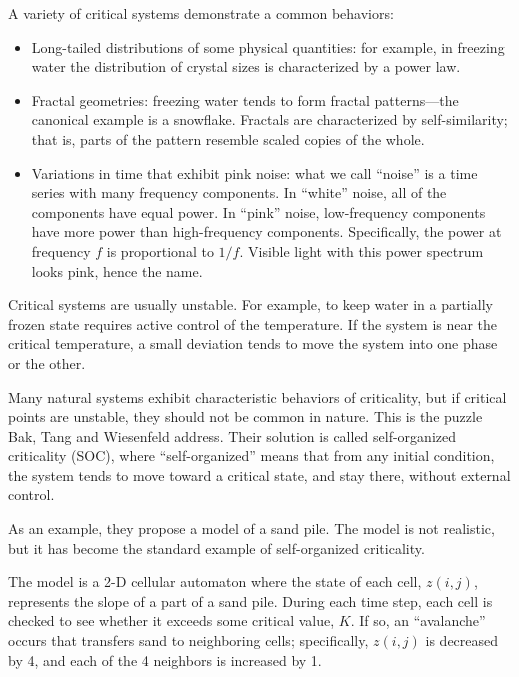\documentclass[10pt]{book}
\begin{document}
A variety of critical systems demonstrate a common behaviors:

\begin{itemize}

\item Long-tailed distributions of some physical quantities: for
  example, in freezing water the distribution of crystal sizes is
  characterized by a power law.

\item Fractal geometries: freezing water tends to form fractal
  patterns---the canonical example is a snowflake.  Fractals
  are characterized by self-similarity; that is, parts of the
  pattern resemble scaled copies of the whole.

\item Variations in time that exhibit pink noise: what we call
  ``noise'' is a time series with many frequency components.  In
  ``white'' noise, all of the components have equal power.  In
  ``pink'' noise, low-frequency components have more power than
  high-frequency components.  Specifically, the power at frequency $f$
  is proportional to $1/f$.  Visible light with this power spectrum
  looks pink, hence the name.

\end{itemize}

Critical systems are usually unstable.  For example, to keep
water in a partially frozen state requires active control of
the temperature.  If the system is near the critical
temperature, a small deviation tends to move the system
into one phase or the other.

Many natural systems exhibit characteristic behaviors of
criticality, but if critical points are unstable, they should
not be common in nature.  This is the puzzle Bak, Tang and
Wiesenfeld address.  Their solution is called self-organized
criticality (SOC), where ``self-organized'' means that from
any initial condition, the system tends to move toward a
critical state, and stay there, without external control.

As an example, they propose a model of a sand pile.  The model is not
realistic, but it has become the standard example of self-organized
criticality.

The model is a 2-D cellular automaton where the state of each cell,
$z(i,j)$, represents the slope of a part of a sand pile.  During each
time step, each cell is checked to see whether it exceeds some
critical value, $K$.  If so, an ``avalanche'' occurs that transfers
sand to neighboring cells; specifically, $z(i,j)$ is decreased by 4,
and each of the 4 neighbors is increased by 1.
\end{document}
